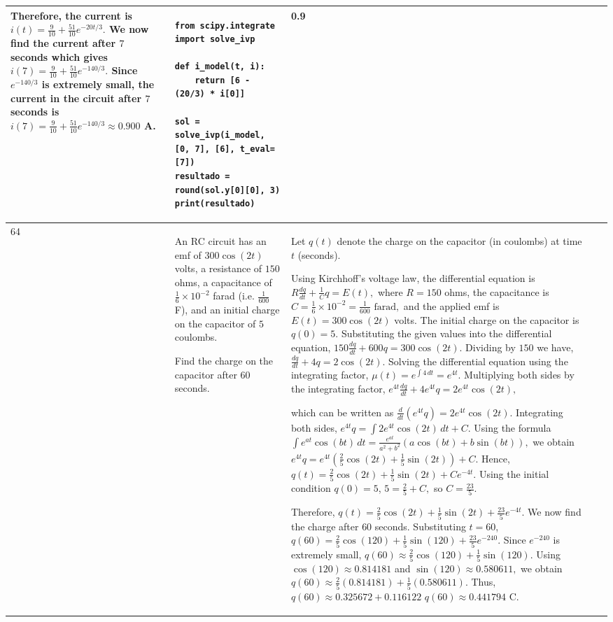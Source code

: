 \documentclass[a4paper,12pt]{article}
\begin{document}
\begin{longtable}{|p{0.3cm}|p{}|p{10cm}|p{}|p{1.5cm}|}
Therefore, the current is
$i(t)=\frac{9}{10}+\frac{51}{10}e^{-20t/3}.$
We now find the current after $7$ seconds which gives $i(7)=\frac{9}{10}+\frac{51}{10}e^{-140/3}.$
Since $e^{-140/3}$ is extremely small, the current in the circuit after $7$ seconds is $i(7)=\frac{9}{10}+\frac{51}{10}e^{-140/3}\approx0.900$ A.

 &\begin{verbatim}
from scipy.integrate import solve_ivp

def i_model(t, i):
    return [6 - (20/3) * i[0]]

sol = solve_ivp(i_model, [0, 7], [6], t_eval=[7])
resultado = round(sol.y[0][0], 3)
print(resultado)
\end{verbatim}& 0.9 \\ \hline 
 64           & An RC circuit has an emf of $300 \cos(2t)$ volts, a resistance of $150$ ohms, a capacitance of $\frac{1}{6} \times 10^{-2}$ farad (i.e. $\frac{1}{600}$ F), and an initial charge on the capacitor of $5$ coulombs. 

Find the charge on the capacitor after $60$ seconds.


              &Let $q(t)$ denote the charge on the capacitor (in coulombs) at time $t$ (seconds).

Using Kirchhoff's voltage law, the differential equation is 
$R\frac{dq}{dt}+\frac{1}{C}q=E(t),$
where $R=150$ ohms, the capacitance is $C=\frac{1}{6}\times10^{-2}=\frac{1}{600}\text{ farad},$ and the applied emf is
$E(t)=300\cos(2t)$ volts.
The initial charge on the capacitor is $q(0)=5.$ Substituting the given values into the differential equation,
$150\frac{dq}{dt}+600q=300\cos(2t).$
Dividing by $150$ we have, $\frac{dq}{dt}+4q=2\cos(2t).$
Solving the differential equation using the integrating factor,
$\mu(t)=e^{\int4\,dt}=e^{4t}.$
Multiplying both sides by the integrating factor,
$e^{4t}\frac{dq}{dt}+4e^{4t}q
=2e^{4t}\cos(2t),$

which can be written as
$\frac{d}{dt}\left(e^{4t}q\right)
=2e^{4t}\cos(2t).$
Integrating both sides,
$e^{4t}q
=\int2e^{4t}\cos(2t)\,dt+C.$
Using the formula $\int e^{at}\cos(bt)\,dt
=\frac{e^{at}}{a^2+b^2}
\left(a\cos(bt)+b\sin(bt)\right),$
we obtain $e^{4t}q
=e^{4t}\left(\frac{2}{5}\cos(2t)+\frac{1}{5}\sin(2t)\right)+C.$
Hence, $q(t)=\frac{2}{5}\cos(2t)+\frac{1}{5}\sin(2t)+Ce^{-4t}.$
Using the initial condition $q(0)=5$, $5=\frac{2}{5}+C,$ so $C=\frac{23}{5}.$

Therefore, $q(t)=\frac{2}{5}\cos(2t)+\frac{1}{5}\sin(2t)
+\frac{23}{5}e^{-4t}.$
We now find the charge after $60$ seconds. Substituting $t=60$,
$q(60)=\frac{2}{5}\cos(120)+\frac{1}{5}\sin(120)
+\frac{23}{5}e^{-240}.$
Since $e^{-240}$ is extremely small,
$q(60)\approx\frac{2}{5}\cos(120)+\frac{1}{5}\sin(120).$
Using $\cos(120)\approx0.814181$
and $\sin(120)\approx0.580611,$
we obtain $q(60)\approx\frac{2}{5}(0.814181)
+\frac{1}{5}(0.580611).$
Thus,$q(60)\approx0.325672+0.116122$
$q(60)\approx0.441794$ C.


\end{longtable}
\end{document}
